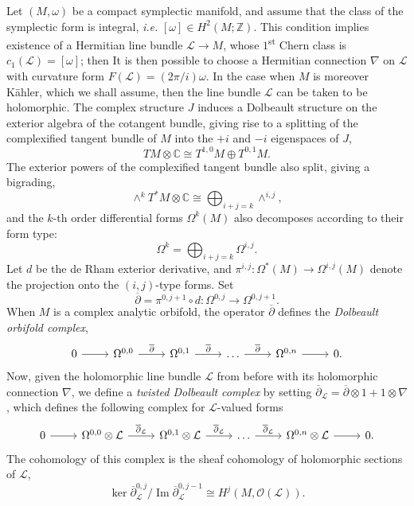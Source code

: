 \documentclass{amsart}
\newcommand{\ie}{\emph{i.e.} }
\newcommand{\ra}{\rightarrow}
\newcommand{\w}{\omega}
\newcommand{\CC}{\mathbb{C}}
\newcommand{\ZZ}{\mathbb{Z}}
\newcommand{\mcL}{\mathcal{L}}
\newcommand{\mcO}{\mathcal{O}}
\newcommand{\dbar}{\overline{\partial}}
\DeclareMathOperator{\Image}{Im}
\begin{document}
	Let $(M, \w)$ be a compact symplectic manifold, and assume that the class of the symplectic form is integral, \ie $[\w] \in H^{2}(M; \ZZ)$. This condition implies existence of a Hermitian line bundle $\mcL \ra M$, whose $1$\textsuperscript{st} Chern class is $c_{1}(\mcL) = [\w]$; then It is then possible to choose a Hermitian connection $\nabla$ on $\mcL$ with curvature form $F(\mcL) = (2\pi/i)\w$. In the case when $M$ is moreover K\"ahler, which we shall assume, then the line bundle $\mcL$ can be taken to be holomorphic. The complex structure $J$ induces a Dolbeault structure on the exterior algebra of the cotangent bundle, giving rise to a splitting of the complexified tangent bundle of $M$ into the $+i$ and $-i$ eigenspaces of $J$,
    \[
        TM \otimes \CC \cong T^{1,0}M \oplus T^{0,1}M.
    \]
    The exterior powers of the complexified tangent bundle also split, giving a bigrading,
    \[
        \wedge^{k}T^{\ast}M \otimes \CC \cong \bigoplus_{i + j = k} \wedge^{i,j},
    \]
    and the $k$-th order differential forms $\Omega^{k}(M)$ also decomposes according to their form type:
    \[
        \Omega^{k} = \bigoplus_{i + j = k}\Omega^{i,j}.
    \]
    Let $d$ be the de Rham exterior derivative, and $\pi^{i,j} : \Omega^{\ast}(M) \ra \Omega^{i,j}(M)$ denote the projection onto the $(i,j)$-type forms. Set
    \[
        \dbar = \pi^{0,j+1} \circ d : \Omega^{0,j} \ra \Omega^{0,j+1}.
    \]
    When $M$ is a complex analytic orbifold, the operator $\dbar$ defines the \emph{Dolbeault orbifold complex},
    \[
        \begin{tikzcd}[ampersand replacement=\&]
            0 \ar[r] \& \Omega^{0,0} \ar[r, "\dbar"] \& \Omega^{0,1} \ar[r, "\dbar"] \& \ldots \ar[r, "\dbar"] \& \Omega^{0,n} \ar[r] \& 0.
        \end{tikzcd}
    \]
    Now, given the holomorphic line bundle $\mcL$ from before with its holomorphic connection $\nabla$, we define a \emph{twisted Dolbeault complex} by setting $\dbar_{\mcL} = \dbar \otimes 1 + 1 \otimes \nabla$, which defines the following complex for $\mcL$-valued forms
    \[
    \begin{tikzcd}[ampersand replacement=\&]
        0 \ar[r] \& \Omega^{0,0} \otimes \mcL \ar[r, "\dbar_{\mcL}"] \& \Omega^{0,1} \otimes \mcL \ar[r, "\dbar_{\mcL}"] \& \ldots \ar[r, "\dbar_{\mcL}"] \& \Omega^{0,n} \otimes \mcL \ar[r] \& 0.
    \end{tikzcd}
    \]
    The cohomology of this complex is the sheaf cohomology of holomorphic sections of $\mcL$,
    \[
        \ker \dbar_{\mcL}^{0,j} / \Image \dbar_{\mcL}^{0,j-1} \cong H^{j}(M, \mcO(\mcL)).
    \]
\end{document}
